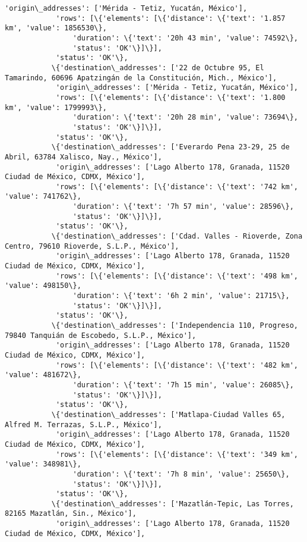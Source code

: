 \documentclass[11pt]{article}
\begin{document}
\begin{Verbatim}[commandchars=\\\{\}]
            'origin\_addresses': ['Mérida - Tetiz, Yucatán, México'],
            'rows': [\{'elements': [\{'distance': \{'text': '1.857 km', 'value': 1856530\},
                'duration': \{'text': '20h 43 min', 'value': 74592\},
                'status': 'OK'\}]\}],
            'status': 'OK'\},
           \{'destination\_addresses': ['22 de Octubre 95, El Tamarindo, 60696 Apatzingán de la Constitución, Mich., México'],
            'origin\_addresses': ['Mérida - Tetiz, Yucatán, México'],
            'rows': [\{'elements': [\{'distance': \{'text': '1.800 km', 'value': 1799993\},
                'duration': \{'text': '20h 28 min', 'value': 73694\},
                'status': 'OK'\}]\}],
            'status': 'OK'\},
           \{'destination\_addresses': ['Everardo Pena 23-29, 25 de Abril, 63784 Xalisco, Nay., México'],
            'origin\_addresses': ['Lago Alberto 178, Granada, 11520 Ciudad de México, CDMX, México'],
            'rows': [\{'elements': [\{'distance': \{'text': '742 km', 'value': 741762\},
                'duration': \{'text': '7h 57 min', 'value': 28596\},
                'status': 'OK'\}]\}],
            'status': 'OK'\},
           \{'destination\_addresses': ['Cdad. Valles - Rioverde, Zona Centro, 79610 Rioverde, S.L.P., México'],
            'origin\_addresses': ['Lago Alberto 178, Granada, 11520 Ciudad de México, CDMX, México'],
            'rows': [\{'elements': [\{'distance': \{'text': '498 km', 'value': 498150\},
                'duration': \{'text': '6h 2 min', 'value': 21715\},
                'status': 'OK'\}]\}],
            'status': 'OK'\},
           \{'destination\_addresses': ['Independencia 110, Progreso, 79840 Tanquián de Escobedo, S.L.P., México'],
            'origin\_addresses': ['Lago Alberto 178, Granada, 11520 Ciudad de México, CDMX, México'],
            'rows': [\{'elements': [\{'distance': \{'text': '482 km', 'value': 481672\},
                'duration': \{'text': '7h 15 min', 'value': 26085\},
                'status': 'OK'\}]\}],
            'status': 'OK'\},
           \{'destination\_addresses': ['Matlapa-Ciudad Valles 65, Alfred M. Terrazas, S.L.P., México'],
            'origin\_addresses': ['Lago Alberto 178, Granada, 11520 Ciudad de México, CDMX, México'],
            'rows': [\{'elements': [\{'distance': \{'text': '349 km', 'value': 348981\},
                'duration': \{'text': '7h 8 min', 'value': 25650\},
                'status': 'OK'\}]\}],
            'status': 'OK'\},
           \{'destination\_addresses': ['Mazatlán-Tepic, Las Torres, 82165 Mazatlán, Sin., México'],
            'origin\_addresses': ['Lago Alberto 178, Granada, 11520 Ciudad de México, CDMX, México'],

\end{Verbatim}
\end{document}
